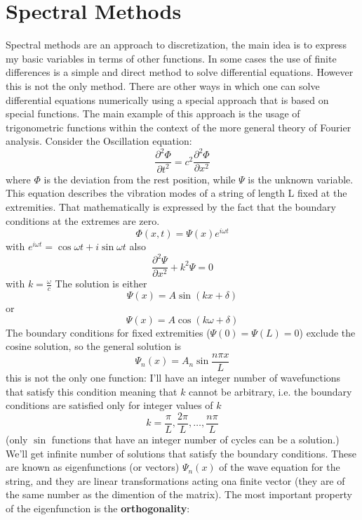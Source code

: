 \section{Spectral Methods}
Spectral methods are an approach to discretization, the main idea is to express my basic variables in terms of other functions.
In some cases the use of finite differences is a simple and direct method to solve differential equations. However this is not the only method. There are other ways in which one can solve differential equations numerically using a special approach that is based on special functions. The main example of this approach is the usage of trigonometric functions within the context of the more general theory of Fourier analysis. Consider the Oscillation equation:
\begin{equation}\label{eq:oscillation}
    \frac{\partial^2\Phi}{\partial t^2}=c^2\frac{\partial^2\Phi}{\partial x^2}
\end{equation}
where $\Phi$ is the deviation from the rest position, while $\Psi$ is the unknown variable. 
This equation describes the vibration modes of a string of length L fixed at the extremities. That mathematically is expressed by the fact that the boundary conditions at the extremes are zero. 
\begin{equation}
    \Phi(x,t)=\Psi(x)e^{i\omega t}
\end{equation}
with $e^{i\omega t}=\cos \omega t+i\sin\omega t$
also 
\begin{equation}
    \frac{\partial^2\Psi}{\partial x^2}+k^2\Psi=0
\end{equation} with $k=\frac{\omega}{c}$
The solution is either $$\Psi(x)=A\sin(kx+\delta)$$
or $$\Psi(x)=A\cos(k\omega+\delta)$$
The boundary conditions for fixed extremities ($\Psi(0)=\Psi(L)=0$) exclude the cosine solution, so the general solution is 
\begin{equation}\label{psin}
    \Psi_n(x)=A_n\sin\frac{n\pi x}{L}
\end{equation}
this is not the only one function: I'll have an integer number of wavefunctions that satisfy this condition meaning that $k$ cannot be arbitrary, i.e. the boundary conditions are satisfied only for integer values of $k$
$$k=\frac{\pi}{L}, \frac{2\pi}{L}, \dots, \frac{n\pi}{L}$$
(only $\sin$ functions that have an integer number of cycles can be a solution.)  We'll get infinite number of solutions that satisfy the boundary conditions. These are known as eigenfunctions (or vectors) $\Psi_n(x)$ of the wave equation for the string, and they are linear transformations acting ona finite vector (they are of the same number as the dimention of the matrix). The most important property of the eigenfunction is the \textbf{orthogonality}:
